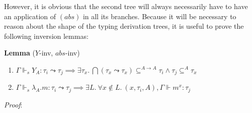 \documentclass[a4paper, 12pt, twoside]{style/ociamthesis}
\providecommand{\tightlist}{%
  \setlength{\itemsep}{0pt}\setlength{\parskip}{0pt}}
\newcommand{\concat}{\ensuremath{+\!\!\!\!+\,}}
\newcommand{\tocap}{\leadsto\kern-.5ex\cap}
\begin{document}

However, it is obvious that the second tree will always necessarily have
to have an application of \((abs)\) in all its branches. Because it will
be necessary to reason about the shape of the typing derivation trees,
it is useful to prove the following inversion lemmas:

\textbf{Lemma} (\(Y\)-inv, \(abs\)-inv)

\begin{enumerate}
\def\labelenumi{\roman{enumi})}
\tightlist
\item
  \(\Gamma \Vdash_s Y_{A} : \tau_i \leadsto \tau_j \implies \exists \tau_x.\ \bigcap (\tau_x \leadsto \tau_x) \subseteq^{A \to A} \tau_i \land \tau_j \subseteq^A \tau_x\)
\item
  \(\Gamma \Vdash_s \lambda_A.m : \tau_i \leadsto \tau_j \implies \exists L.\ \forall x \not\in L.\ (x, \tau_i, A),\Gamma \Vdash m^x : \tau_j\)
\end{enumerate}

\emph{Proof}:
\end{document}
